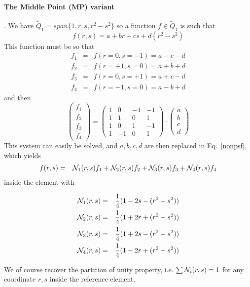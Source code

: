 \paragraph{The Middle Point (MP) variant}. 
We have $\tilde{Q}_1=span \{ 1,r,s,r^2-s^2 \}$
so a function $f \in \tilde{Q}_1$  is such that 
\begin{equation}
f(r,s)= a + b r + c s + d(r^2-s^2 )
\label{nonpsf}
\end{equation}
This function must be so that 
\begin{eqnarray}
f_1 &=& f(r=0 ,s=-1) = a -c -d \\
f_2 &=& f(r=+1,s=0)  = a +b +d \\
f_3 &=& f(r=0 ,s=+1) = a +c -d \\
f_4 &=& f(r=-1,s=0)  = a -b +d 
\end{eqnarray}
and then 
\[
\left(
\begin{array}{c}
f_1 \\ f_2 \\ f_3 \\ f_4
\end{array}
\right)
=
\left(
\begin{array}{cccc}
1 &0 &-1 &-1 \\
1 &1 &0 &1 \\
1 &0 &1 &-1 \\
1 &-1 &0 &1
\end{array}
\right)
\cdot
\left(
\begin{array}{c}
a \\ b \\ c \\ d
\end{array}
\right)
\]
This system can easily be solved, and $a,b,c,d$ are then replaced in Eq.~\eqref{nonpsf},
which yields 
\begin{eqnarray}
f(r,s) &=& {\mathcal{N}}_1(r,s)f_1 +{\mathcal{N}}_2(r,s)f_2 + {\mathcal{N}}_3(r,s)f_3 +{\mathcal{N}}_4(r,s)f_4
\end{eqnarray}
inside the element with
\begin{mdframed}[backgroundcolor=blue!5]
\begin{eqnarray}
{\mathcal{N}}_1(r,s) &=& \frac{1}{4} (1-2s-(r^2-s^2)) \nonumber\\
{\mathcal{N}}_2(r,s) &=& \frac{1}{4} (1+2r+(r^2-s^2)) \nonumber\\
{\mathcal{N}}_3(r,s) &=& \frac{1}{4} (1+2s-(r^2-s^2)) \nonumber\\
{\mathcal{N}}_4(r,s) &=& \frac{1}{4} (1-2r+(r^2-s^2)) \nonumber
\end{eqnarray}
\end{mdframed}
We of course recover the partition of unity property, i.e. $\sum {\mathcal{N}}_i(r,s)=1$ for any coordinate $r,s$ inside 
the reference element.

